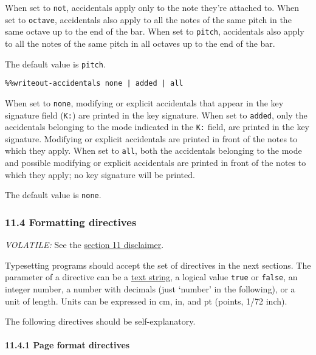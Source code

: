 When set to \texttt{not}, accidentals apply only to the note they're
attached to. When set to \texttt{octave}, accidentals also apply to all
the notes of the same pitch in the same octave up to the end of the bar.
When set to \texttt{pitch}, accidentals also apply to all the notes of
the same pitch in all octaves up to the end of the bar.

The default value is \texttt{pitch}.

\begin{verbatim}
%%writeout-accidentals none | added | all
\end{verbatim}

When set to \texttt{none}, modifying or explicit accidentals that appear
in the key signature field (\texttt{K:}) are printed in the key
signature. When set to \texttt{added}, only the accidentals belonging to
the mode indicated in the \texttt{K:} field, are printed in the key
signature. Modifying or explicit accidentals are printed in front of the
notes to which they apply. When set to \texttt{all}, both the
accidentals belonging to the mode and possible modifying or explicit
accidentals are printed in front of the notes to which they apply; no
key signature will be printed.

The default value is \texttt{none}.

\hypertarget{formatting_directives}{\subsubsection{11.4 Formatting
directives}\label{formatting_directives}}

\emph{VOLATILE:} See the \protect\hyperlink{disclaimer}{section 11
disclaimer}.

Typesetting programs should accept the set of directives in the next
sections. The parameter of a directive can be a
\protect\hyperlink{text_string_definition}{text string}, a logical value
\texttt{true} or \texttt{false}, an integer number, a number with
decimals (just `number' in the following), or a unit of length. Units
can be expressed in cm, in, and pt (points, 1/72 inch).

The following directives should be self-explanatory.

\hypertarget{page_format_directives}{\paragraph{11.4.1 Page format
directives}\label{page_format_directives}}

